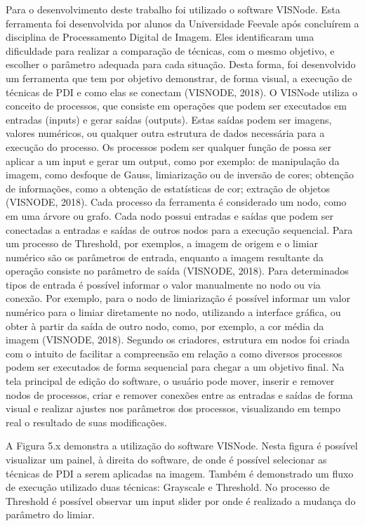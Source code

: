 \documentclass[
	12pt,				%
	oneside,			%
	a4paper,			%
	english,			%
	french,				%
	spanish,			%
	brazil,				%
	]{abntex2}
\begin{document}
	Para o desenvolvimento deste trabalho foi utilizado o software VISNode. Esta ferramenta foi desenvolvida por alunos da Universidade Feevale após concluírem a disciplina de Processamento Digital de Imagem. Eles identificaram uma dificuldade para realizar a comparação de técnicas, com o mesmo objetivo, e escolher o parâmetro adequada para cada situação. Desta forma, foi desenvolvido um ferramenta que tem por objetivo demonstrar, de forma visual,  a execução de técnicas de PDI e como elas se conectam (VISNODE, 2018).
	O VISNode utiliza o conceito de processos, que consiste em operações que podem ser executados em entradas (inputs) e gerar saídas (outputs). Estas saídas podem ser imagens, valores numéricos, ou qualquer outra estrutura de dados necessária para a execução do processo. Os processos podem ser qualquer função de possa ser aplicar a um input e gerar um output, como por exemplo: de manipulação da imagem, como desfoque de Gauss, limiarização ou de inversão de cores; obtenção de informações, como a obtenção de estatísticas de cor;  extração de objetos (VISNODE, 2018).
Cada processo da ferramenta é considerado um nodo, como em uma árvore ou grafo. Cada nodo possui entradas e saídas que podem ser conectadas a entradas e saídas de outros nodos para a execução sequencial. Para um processo de Threshold, por exemplos, a imagem de origem e o limiar numérico são os parâmetros de entrada, enquanto a imagem resultante da operação consiste no parâmetro de saída (VISNODE, 2018). 
Para determinados tipos de entrada é possível informar o valor manualmente no nodo ou via conexão. Por exemplo, para o nodo de limiarização é possível informar um valor numérico para o limiar diretamente no nodo, utilizando a interface gráfica, ou obter à partir da saída de outro nodo, como, por exemplo, a cor média da imagem (VISNODE, 2018).
Segundo os criadores, estrutura em nodos foi criada com o intuito de facilitar a compreensão em relação a como diversos processos podem ser executados de forma sequencial para chegar a um objetivo final. Na tela principal de edição do software, o usuário pode mover, inserir e remover nodos de processos, criar e remover conexões entre as entradas e saídas de forma visual e realizar ajustes nos parâmetros dos processos, visualizando em tempo real o resultado de suas modificações.



	A Figura 5.x demonstra a utilização do software VISNode. Nesta figura é possível visualizar um painel, à direita do software, de onde é possível selecionar as técnicas de PDI a serem aplicadas na imagem. Também é demonstrado um fluxo de execução utilizado duas técnicas: Grayscale e Threshold. No processo de Threshold é possível observar um input slider por onde é realizado a mudança do parâmetro do limiar.
\end{document}
